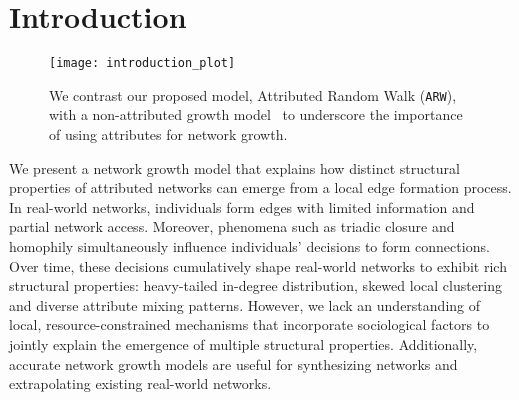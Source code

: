 \section{Introduction}
\label{sec:Introduction}

\begin{figure}
	\centering
	\texttt{[image: introduction\_plot]}
    \caption{We contrast our proposed model, Attributed Random Walk (\texttt{ARW}), with a non-attributed growth model~\cite{holme2002growing} to underscore the importance of using attributes for network growth.}
	\label{fig:intro_plot}
  \vspace{-20pt}
\end{figure}




We present a network growth model that explains how distinct
structural properties of attributed networks can emerge from a local edge
formation process. In real-world networks, individuals form edges
with limited information and partial network access.
Moreover, phenomena such as triadic closure and homophily
simultaneously influence individuals' decisions to form connections.
Over time, these decisions cumulatively shape real-world networks to exhibit
rich structural properties: heavy-tailed in-degree distribution, skewed
local clustering and diverse attribute mixing patterns. However, we lack an
understanding of local, resource-constrained mechanisms that incorporate
sociological factors to jointly explain the emergence of multiple structural properties.
Additionally, accurate network growth models are useful for synthesizing networks and extrapolating existing real-world networks.




